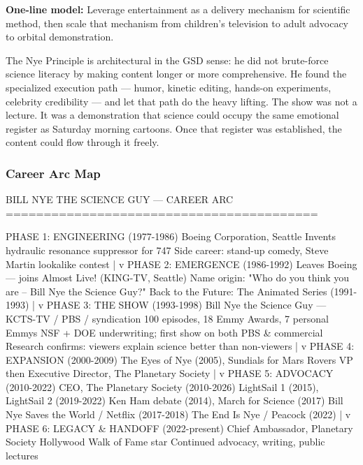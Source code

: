 \documentclass[11pt,letterpaper]{article}
\begin{document}
\textbf{One-line model:} Leverage entertainment as a delivery mechanism for scientific method, then scale that mechanism from children's television to adult advocacy to orbital demonstration.

The Nye Principle is architectural in the GSD sense: he did not brute-force science literacy by making content longer or more comprehensive. He found the specialized execution path --- humor, kinetic editing, hands-on experiments, celebrity credibility --- and let that path do the heavy lifting. The show was not a lecture. It was a demonstration that science could occupy the same emotional register as Saturday morning cartoons. Once that register was established, the content could flow through it freely.

\subsubsection{Career Arc Map}

\begin{asciibox}
BILL NYE THE SCIENCE GUY --- CAREER ARC
=========================================

PHASE 1: ENGINEERING (1977-1986)
  Boeing Corporation, Seattle
  Invents hydraulic resonance suppressor for 747
  Side career: stand-up comedy, Steve Martin lookalike contest
             |
             v
PHASE 2: EMERGENCE (1986-1992)
  Leaves Boeing --- joins Almost Live! (KING-TV, Seattle)
  Name origin: "Who do you think you are -- Bill Nye the Science Guy?"
  Back to the Future: The Animated Series (1991-1993)
             |
             v
PHASE 3: THE SHOW (1993-1998)
  Bill Nye the Science Guy --- KCTS-TV / PBS / syndication
  100 episodes, 18 Emmy Awards, 7 personal Emmys
  NSF + DOE underwriting; first show on both PBS & commercial
  Research confirms: viewers explain science better than non-viewers
             |
             v
PHASE 4: EXPANSION (2000-2009)
  The Eyes of Nye (2005), Sundials for Mars Rovers
  VP then Executive Director, The Planetary Society
             |
             v
PHASE 5: ADVOCACY (2010-2022)
  CEO, The Planetary Society (2010-2026)
  LightSail 1 (2015), LightSail 2 (2019-2022)
  Ken Ham debate (2014), March for Science (2017)
  Bill Nye Saves the World / Netflix (2017-2018)
  The End Is Nye / Peacock (2022)
             |
             v
PHASE 6: LEGACY & HANDOFF (2022-present)
  Chief Ambassador, Planetary Society
  Hollywood Walk of Fame star
  Continued advocacy, writing, public lectures
\end{asciibox}
\end{document}

